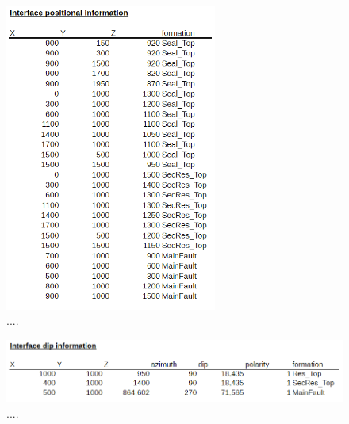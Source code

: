 \documentclass[a4paper,11pt]{MScThesis}
\begin{document}
	\begin{figure}[h]
		\centering
		\includegraphics[width=0.62\textwidth]{Figures/Appendix/CSV_input2}
		\caption{....}\label{fig:CSV_input2}
	\end{figure}

	\begin{figure}[h]
		\centering
		\includegraphics[width=1\textwidth]{Figures/Appendix/CSV_input3}
		\caption{....}\label{fig:CSV_input3}
	\end{figure}
\end{document}
